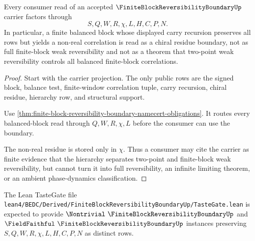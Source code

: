 \begin{theorem}
\label{thm:finite-block-reversibility-boundary-nonescape}
Every consumer read of an accepted $\FiniteBlockReversibilityBoundaryUp$ carrier factors through
$$
S,Q,W,R,\chi,L,H,C,P,N .
$$
In particular, a finite balanced block whose displayed carry recursion preserves all rows but yields a non-real correlation is read as a chiral residue boundary, not as full finite-block weak reversibility and not as a theorem that two-point weak reversibility controls all balanced finite-block correlations.
\end{theorem}
\begin{proof}
Start with the carrier projection. The only public rows are the signed block, balance test, finite-window correlation tuple, carry recursion, chiral residue, hierarchy row, and structural support.

Use \autoref{thm:finite-block-reversibility-boundary-namecert-obligations}. It routes every balanced-block read through $Q,W,R,\chi,L$ before the consumer can use the boundary.

The non-real residue is stored only in $\chi$. Thus a consumer may cite the carrier as finite evidence that the hierarchy separates two-point and finite-block weak reversibility, but cannot turn it into full reversibility, an infinite limiting theorem, or an ambient phase-dynamics classification.
\end{proof}



The Lean TasteGate file \texttt{lean4/BEDC/Derived/FiniteBlockReversibilityBoundaryUp/TasteGate.lean} is expected to provide $\Nontrivial\ \FiniteBlockReversibilityBoundaryUp$ and $\FieldFaithful\ \FiniteBlockReversibilityBoundaryUp$ instances preserving $S,Q,W,R,\chi,L,H,C,P,N$ as distinct rows.



